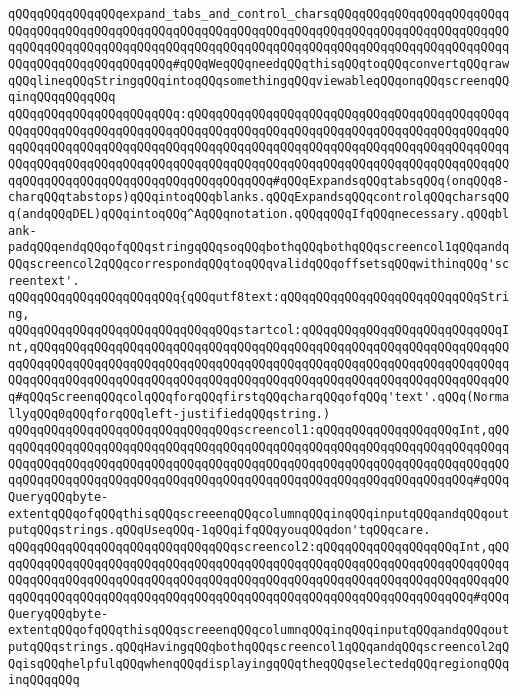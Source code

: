 \newline
\verb|qQQqqQQqqQQqqQQqexpand_tabs_and_control_charsqQQqqQQqqQQqqQQqqQQqqQQqqQQqqQQqqQQqqQQqqQQqqQQqqQQqqQQqqQQqqQQqqQQqqQQqqQQqqQQqqQQqqQQqqQQqqQQqqQQqqQQqqQQqqQQqqQQqqQQqqQQqqQQqqQQqqQQqqQQqqQQqqQQqqQQqqQQqqQQqqQQqqQQqqQQqqQQqqQQqqQQqqQQq#qQQqWeqQQqneedqQQqthisqQQqtoqQQqconvertqQQqrawqQQqlineqQQqStringqQQqintoqQQqsomethingqQQqviewableqQQqonqQQqscreenqQQqinqQQqqQQqqQQq|\newline
\verb|qQQqqQQqqQQqqQQqqQQqqQQq:qQQqqQQqqQQqqQQqqQQqqQQqqQQqqQQqqQQqqQQqqQQqqQQqqQQqqQQqqQQqqQQqqQQqqQQqqQQqqQQqqQQqqQQqqQQqqQQqqQQqqQQqqQQqqQQqqQQqqQQqqQQqqQQqqQQqqQQqqQQqqQQqqQQqqQQqqQQqqQQqqQQqqQQqqQQqqQQqqQQqqQQqqQQqqQQqqQQqqQQqqQQqqQQqqQQqqQQqqQQqqQQqqQQqqQQqqQQqqQQqqQQqqQQqqQQqqQQqqQQqqQQqqQQqqQQqqQQqqQQqqQQqqQQqqQQq#qQQqExpandsqQQqtabsqQQq(onqQQq8-charqQQqtabstops)qQQqintoqQQqblanks.qQQqExpandsqQQqcontrolqQQqcharsqQQq(andqQQqDEL)qQQqintoqQQq^AqQQqnotation.qQQqqQQqIfqQQqnecessary.qQQqblank-padqQQqendqQQqofqQQqstringqQQqsoqQQqbothqQQqbothqQQqscreencol1qQQqandqQQqscreencol2qQQqcorrespondqQQqtoqQQqvalidqQQqoffsetsqQQqwithinqQQq'screentext'.|\newline
\verb|qQQqqQQqqQQqqQQqqQQqqQQq{qQQqutf8text:qQQqqQQqqQQqqQQqqQQqqQQqqQQqString,|\newline
\verb|qQQqqQQqqQQqqQQqqQQqqQQqqQQqqQQqstartcol:qQQqqQQqqQQqqQQqqQQqqQQqqQQqInt,qQQqqQQqqQQqqQQqqQQqqQQqqQQqqQQqqQQqqQQqqQQqqQQqqQQqqQQqqQQqqQQqqQQqqQQqqQQqqQQqqQQqqQQqqQQqqQQqqQQqqQQqqQQqqQQqqQQqqQQqqQQqqQQqqQQqqQQqqQQqqQQqqQQqqQQqqQQqqQQqqQQqqQQqqQQqqQQqqQQqqQQqqQQqqQQqqQQqqQQqqQQqqQQq#qQQqScreenqQQqcolqQQqforqQQqfirstqQQqcharqQQqofqQQq'text'.qQQq(NormallyqQQq0qQQqforqQQqleft-justifiedqQQqstring.)|\newline
\verb|qQQqqQQqqQQqqQQqqQQqqQQqqQQqqQQqscreencol1:qQQqqQQqqQQqqQQqqQQqInt,qQQqqQQqqQQqqQQqqQQqqQQqqQQqqQQqqQQqqQQqqQQqqQQqqQQqqQQqqQQqqQQqqQQqqQQqqQQqqQQqqQQqqQQqqQQqqQQqqQQqqQQqqQQqqQQqqQQqqQQqqQQqqQQqqQQqqQQqqQQqqQQqqQQqqQQqqQQqqQQqqQQqqQQqqQQqqQQqqQQqqQQqqQQqqQQqqQQqqQQqqQQqqQQq#qQQqQueryqQQqbyte-extentqQQqofqQQqthisqQQqscreeenqQQqcolumnqQQqinqQQqinputqQQqandqQQqoutputqQQqstrings.qQQqUseqQQq-1qQQqifqQQqyouqQQqdon'tqQQqcare.|\newline
\verb|qQQqqQQqqQQqqQQqqQQqqQQqqQQqqQQqscreencol2:qQQqqQQqqQQqqQQqqQQqInt,qQQqqQQqqQQqqQQqqQQqqQQqqQQqqQQqqQQqqQQqqQQqqQQqqQQqqQQqqQQqqQQqqQQqqQQqqQQqqQQqqQQqqQQqqQQqqQQqqQQqqQQqqQQqqQQqqQQqqQQqqQQqqQQqqQQqqQQqqQQqqQQqqQQqqQQqqQQqqQQqqQQqqQQqqQQqqQQqqQQqqQQqqQQqqQQqqQQqqQQqqQQqqQQq#qQQqQueryqQQqbyte-extentqQQqofqQQqthisqQQqscreeenqQQqcolumnqQQqinqQQqinputqQQqandqQQqoutputqQQqstrings.qQQqHavingqQQqbothqQQqscreencol1qQQqandqQQqscreencol2qQQqisqQQqhelpfulqQQqwhenqQQqdisplayingqQQqtheqQQqselectedqQQqregionqQQqinqQQqqQQq|\newline
